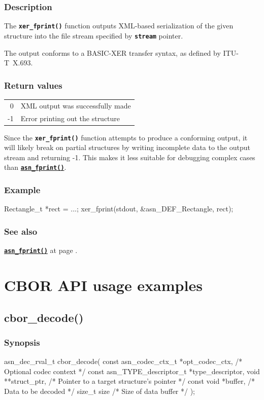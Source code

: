 \documentclass[english,oneside,12pt]{book}
\newcommand{\apisection}[2]{\clearpage\section{\label{#1}#2}}
\newcommand{\api}[2]{\hyperref[#1]{\code{#2}}}
\newcommand{\seealso}[2]{\api{#1}{#2} at page \pageref{#1}}
\newcommand{\code}[1]{\texttt{\textbf{\lstinline{#1}}}}
\begin{document}
\subsection*{Description}

The \code{xer_fprint()} function outputs XML-based serialization
of the given structure into the file stream specified by
\code{stream} pointer.

The output conforms to a BASIC-XER transfer syntax, as defined by ITU-T~X.693.

\subsection*{Return values}

\begin{tabular}[h!]{rl}
0 & XML output was successfully made \\
-1 & Error printing out the structure
\end{tabular}

\noindent{}Since the \code{xer_fprint()} function attempts to produce a conforming output,
it will likely break on partial structures by writing incomplete data
to the output stream and returning -1. This makes it less suitable for
debugging complex cases than \api{sec:asn_fprint}{asn_fprint()}.

\subsection*{Example}
\begin{example}
Rectangle_t *rect = ...;
xer_fprint(stdout, &asn_DEF_Rectangle, rect);
\end{example}

\subsection*{See also}
\seealso{sec:asn_fprint}{asn_fprint()}.

\chapter{CBOR API usage examples}

\apisection{sec:cbor_decode}{cbor\_decode()}

\subsection*{Synopsis}
\begin{signature}
asn_dec_rval_t cbor_decode(
    const asn_codec_ctx_t *opt_codec_ctx,   /* Optional codec context */
    const asn_TYPE_descriptor_t *type_descriptor,
    void **struct_ptr,  /* Pointer to a target structure's pointer */
    const void *buffer, /* Data to be decoded */
    size_t size         /* Size of data buffer */
);
\end{signature}
\end{document}
